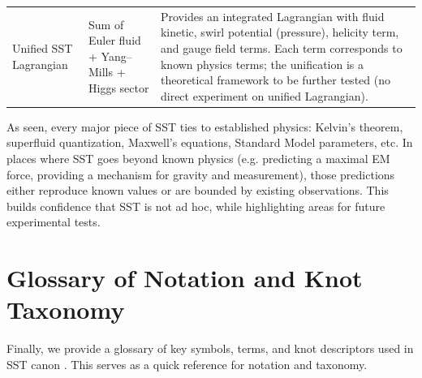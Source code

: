 \documentclass[reprint,aps,onecolumn,nofootinbib]{revtex4-2}
\begin{document}
\begin{table}[hbt!]
\begin{ruledtabular}
\begin{tabular}{|p{3.0cm} p{4.0cm} p{8.0cm}|}
				Unified SST Lagrangian & Sum of Euler fluid + Yang–Mills + Higgs sector & Provides an integrated Lagrangian with fluid kinetic, swirl potential (pressure), helicity term, and gauge field terms. Each term corresponds to known physics terms; the unification is a theoretical framework to be further tested (no direct experiment on unified Lagrangian). \\
			\end{tabular}
		\end{ruledtabular}
	\end{table}

	As seen, every major piece of SST ties to established physics: Kelvin’s theorem, superfluid quantization, Maxwell’s equations, Standard Model parameters, etc. In places where SST goes beyond known physics (e.g. predicting a maximal EM force, providing a mechanism for gravity and measurement), those predictions either reproduce known values or are bounded by existing observations. This builds confidence that SST is not ad hoc, while highlighting areas for future experimental tests.

	\section{Glossary of Notation and Knot Taxonomy}
	Finally, we provide a glossary of key symbols, terms, and knot descriptors used in SST canon \canonversion. This serves as a quick reference for notation and taxonomy.
\end{document}
